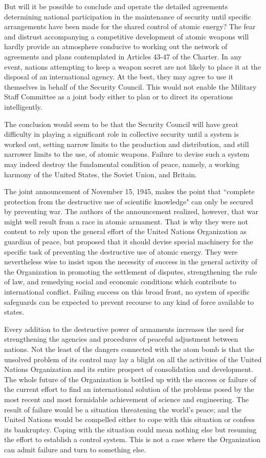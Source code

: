 But will it be possible to conclude and operate the detailed agreements determining national participation in the maintenance of security until specific arrangements have been made for the shared control of atomic energy? The fear and distrust accompanying a competitive development of atomic weapons will hardly provide an atmosphere conducive to working out the network of agreements and plans contemplated in Articles 43-47 of the Charter. In any event, nations attempting to keep a weapon secret are not likely to place it at the disposal of an international agency. At the best, they may agree to use it themselves in behalf of the Security Council. This would not enable the Military Staff Committee as a joint body either to plan or to direct its operations intelligently.

The conclusion would seem to be that the Security Council will have great difficulty in playing a significant role in collective security until a system is worked out, setting narrow limits to the production and distribution, and still narrower limits to the use, of atomic weapons. Failure to devise such a system may indeed destroy the fundamental condition of peace, namely, a working harmony of the United States, the Soviet Union, and Britain.

The joint announcement of November 15, 1945, makes the point that ``complete protection from the destructive use of scientific knowledge" can only be secured by preventing war. The authors of the announcement realized, however, that war might well result from a race in atomic armament. That is why they were not content to rely upon the general effort of the United Nations Organization as guardian of peace, but proposed that it should devise special machinery for the specific task of preventing the destructive use of atomic energy. They were nevertheless wise to insist upon the necessity of success in the general activity of the Organization in promoting the settlement of disputes, strengthening the rule of law, and remedying social and economic conditions which contribute to international conflict. Failing success on this broad front, no system of specific safeguards can be expected to prevent recourse to any kind of force available to states.

Every addition to the destructive power of armaments increases the need for strengthening the agencies and procedures of peaceful adjustment between nations. Not the least of the dangers connected with the atom bomb is that the unsolved problem of its control may lay a blight on all the activities of the United Nations Organization and its entire prospect of consolidation and development. The whole future of the Organization is bottled up with the success or failure of the current effort to find an international solution of the problems posed by the most recent and most formidable achievement of science and engineering. The result of failure would be a situation threatening the world's peace; and the United Nations would be compelled either to cope with this situation or confess its bankruptcy. Coping with the situation could mean nothing else but resuming the effort to establish a control system. This is not a case where the Organization can admit failure and turn to something else.

